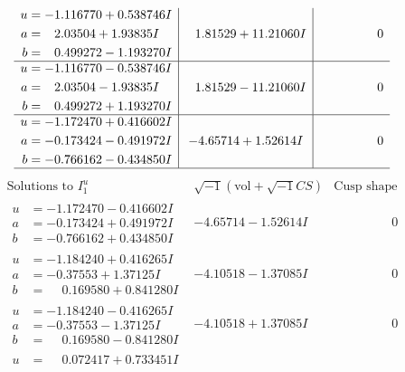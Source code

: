 \documentclass[1p]{elsarticle_modified}
\theoremstyle{definition}
\newcommand{\I}{\sqrt{-1}}
\begin{document}
$$\begin{array}{c|c|c}
\begin{aligned}
u &= -1.116770 + 0.538746 I \\
a &= \phantom{-}2.03504 + 1.93835 I \\
b &= \phantom{-}0.499272 - 1.193270 I\end{aligned}
 & \phantom{-}1.81529 + 11.21060 I & \phantom{-0.000000 } 0 \\ \hline\begin{aligned}
u &= -1.116770 - 0.538746 I \\
a &= \phantom{-}2.03504 - 1.93835 I \\
b &= \phantom{-}0.499272 + 1.193270 I\end{aligned}
 & \phantom{-}1.81529 - 11.21060 I & \phantom{-0.000000 } 0 \\ \hline\begin{aligned}
u &= -1.172470 + 0.416602 I \\
a &= -0.173424 - 0.491972 I \\
b &= -0.766162 - 0.434850 I\end{aligned}
 & -4.65714 + 1.52614 I & \phantom{-0.000000 } 0\\
 \hline 
 \end{array}$$\newpage$$\begin{array}{c|c|c}  
\text{Solutions to }I^u_{1}& \I (\text{vol} + \sqrt{-1}CS) & \text{Cusp shape}\\
 \hline 
\begin{aligned}
u &= -1.172470 - 0.416602 I \\
a &= -0.173424 + 0.491972 I \\
b &= -0.766162 + 0.434850 I\end{aligned}
 & -4.65714 - 1.52614 I & \phantom{-0.000000 } 0 \\ \hline\begin{aligned}
u &= -1.184240 + 0.416265 I \\
a &= -0.37553 + 1.37125 I \\
b &= \phantom{-}0.169580 + 0.841280 I\end{aligned}
 & -4.10518 - 1.37085 I & \phantom{-0.000000 } 0 \\ \hline\begin{aligned}
u &= -1.184240 - 0.416265 I \\
a &= -0.37553 - 1.37125 I \\
b &= \phantom{-}0.169580 - 0.841280 I\end{aligned}
 & -4.10518 + 1.37085 I & \phantom{-0.000000 } 0 \\ \hline\begin{aligned}
u &= \phantom{-}0.072417 + 0.733451 I \\

\end{aligned}
\end{array}$$
\end{document}
